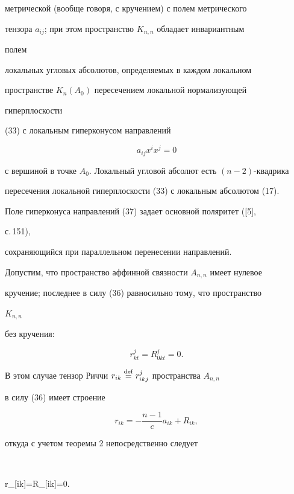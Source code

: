метрической (вообще говоря, с кручением) с полем метрического 


тензора $a_{ij}$; при этом пространство $K_{n,n}$ обладает инвариантным 


полем 


локальных угловых абсолютов, определяемых в каждом локальном 


пространстве $K_n(A_0)$ пересечением локальной нормализующей 


гиперплоскости 


(33) с локальным гиперконусом направлений 


\begin{equation} 


a_{ij}x^i x^j=0 


\end{equation} 


с вершиной в точке $A_0$. Локальный угловой абсолют есть $(n-2)$-квадрика 


пересечения локальной гиперплоскости (33) с локальным абсолютом (17). 


Поле гиперконуса направлений (37) задает основной поляритет ([5], 


с.\,151), 


сохраняющийся при параллельном перенесении направлений. 


 


Допустим, что пространство аффинной связности $A_{n,n}$ имеет нулевое 


кручение; последнее в силу (36) равносильно тому, что пространство 


$K_{n,n}$ 


без кручения: 


$$ 


r^j_{kt}=R^j_{0kt}=0. 


$$ 


В этом случае тензор Риччи $r_{ik}\overset{\mathrm{def}}{=}{} r^j_{ikj}$ пространства $A_{n,n}$ 


в силу (36) имеет строение 


\begin{equation} 


r_{ik}=-\frac{n-1}{c}a_{ik}+R_{ik}, 


\end{equation} 


откуда с учетом теоремы 2 непосредственно следует 


$$ 


r_{[ik]}=R_{[ik]}=0. 


